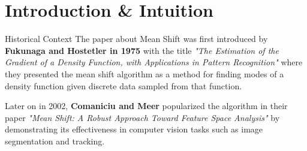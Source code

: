 \section{Introduction \& Intuition}

\begin{frame}{Historical Context}
    The paper about Mean Shift was first introduced by \textbf{Fukunaga and Hostetler in 1975} with the 
    title \textit{"The Estimation of the Gradient of a Density Function, with Applications in Pattern Recognition"}
    where they presented the mean shift algorithm as a method for finding modes of a density function given discrete data sampled from that function.

    \vspace{0.5cm}

    Later on in 2002, \textbf{Comaniciu and Meer} popularized the algorithm in their paper 
    \textit{"Mean Shift: A Robust Approach Toward Feature Space Analysis"} by demonstrating
    its effectiveness in computer vision tasks such as image segmentation and tracking.
\end{frame}

